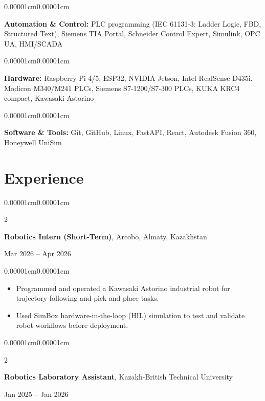 \documentclass[10pt, a4paper]{article}
\newenvironment{highlights}{
    \begin{itemize}[
        topsep=0.10cm,
        parsep=0.06cm,
        partopsep=0pt,
        itemsep=0pt,
        leftmargin=10pt
    ]
}{
    \end{itemize}
}
\newenvironment{onecolentry}{
    \begin{adjustwidth}{0.00001cm}{0.00001cm}
}{
    \end{adjustwidth}
}
\newenvironment{twocolentry}[2][]{
    \onecolentry
    \def\secondColumn{#2}
    \setcolumnwidth{\fill, 4.5cm}
    \begin{paracol}{2}
}{
    \switchcolumn
    \raggedleft
    \secondColumn
    \end{paracol}
    \endonecolentry
}
\begin{document}
        \begin{onecolentry}
            \textbf{Automation \& Control:} PLC programming (IEC 61131-3: Ladder Logic, FBD, Structured Text), Siemens TIA Portal, Schneider Control Expert, Simulink, OPC UA, HMI/SCADA
        \end{onecolentry}
        \vspace{0.12cm}

        \begin{onecolentry}
            \textbf{Hardware:} Raspberry Pi 4/5, ESP32, NVIDIA Jetson, Intel RealSense D435i, Modicon M340/M241 PLCs, Siemens S7-1200/S7-300 PLCs, KUKA KRC4 compact, Kawasaki Astorino
        \end{onecolentry}
        \vspace{0.12cm}

        \begin{onecolentry}
            \textbf{Software \& Tools:} Git, GitHub, Linux, FastAPI, React, Autodesk Fusion 360, Honeywell UniSim
        \end{onecolentry}

    \section{Experience}

        \begin{twocolentry}{Mar 2026 -- Apr 2026}
            \textbf{Robotics Intern (Short-Term)}, Arcobo, Almaty, Kazakhstan
        \end{twocolentry}
        \vspace{0.10cm}

        \begin{onecolentry}
            \begin{highlights}
                \item Programmed and operated a Kawasaki Astorino industrial robot for trajectory-following and pick-and-place tasks.
                \item Used SimBox hardware-in-the-loop (HIL) simulation to test and validate robot workflows before deployment.
            \end{highlights}
        \end{onecolentry}
        \vspace{0.2cm}

        \begin{twocolentry}{Jan 2025 -- Jan 2026}
            \textbf{Robotics Laboratory Assistant}, Kazakh-British Technical University
        \end{twocolentry}
        \vspace{0.10cm}
\end{document}
